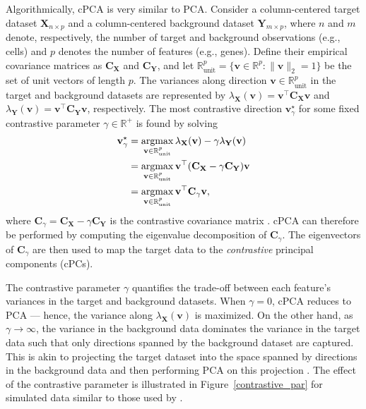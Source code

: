 Algorithmically, cPCA is very similar to PCA. Consider a column-centered target dataset $\mathbf{X}_{n \times p}$ and a column-centered background dataset $\mathbf{Y}_{m \times p}$, where $n$ and $m$ denote, respectively, the number of target and background observations (e.g., cells) and $p$ denotes the number of features (e.g., genes). Define their empirical covariance matrices as $\mathbf{C_X}$ and $\mathbf{C_Y}$, and let $\mathbb{R}_{\text{unit}}^p=\{\mathbf{v} \in \mathbb{R}^p: \lVert\mathbf{v}\rVert_2 = 1\}$ be the set of unit vectors of length $p$. The variances along direction $\mathbf{v} \in \mathbb{R}_{\text{unit}}^p$ in the target and background datasets are represented by $\lambda_{\mathbf{X}}(\mathbf{v}) = \mathbf{v}^\top\mathbf{C_X}\mathbf{v}$ and $\lambda_{\mathbf{Y}}(\mathbf{v}) = \mathbf{v}^\top\mathbf{C_Y}\mathbf{v}$, respectively. The most contrastive direction $\mathbf{v}^{\star}_\gamma$ for some fixed contrastive parameter $\gamma \in \mathbb{R}^+$ is found by solving
\begin{equation}
    \begin{aligned}
  \mathbf{v}^{\star}_\gamma & = \operatorname*{argmax}_{\mathbf{v} \in \mathbb{R}_{\text{unit}}^p}
  \lambda_{\mathbf{X}}(\mathbf{v})-
    \gamma \lambda_{\mathbf{Y}}(\mathbf{v}) \\
  & = \operatorname*{argmax}_{\mathbf{v} \in \mathbb{R}_{\text{unit}}^p}
    \mathbf{v}^\top(\mathbf{C_X} - \gamma\mathbf{C_Y})\mathbf{v} \\
  & = \operatorname*{argmax}_{\mathbf{v} \in \mathbb{R}_{\text{unit}}^p}
    \mathbf{v}^\top\mathbf{C}_{\gamma}\mathbf{v},
\end{aligned}
\end{equation}
where $\mathbf{C}_{\gamma} =  \mathbf{C_X} - \gamma\mathbf{C_Y}$ is the contrastive covariance matrix \cite{Abid2018}. cPCA can therefore be performed by computing the eigenvalue decomposition of $\mathbf{C}_{\gamma}$. The eigenvectors of $\mathbf{C}_{\gamma}$ are then used to map the target data to the \textit{contrastive} principal components (cPCs).

The contrastive parameter $\gamma$ quantifies the trade-off between each feature's variances in the target and background datasets. When $\gamma = 0$, cPCA reduces to PCA --- hence, the variance along $\lambda_{\mathbf{X}}(\mathbf{v})$ is maximized. On the other hand, as $\gamma \rightarrow \infty$, the variance in the background data dominates the variance in the target data such that only directions spanned by the background dataset are captured. This is akin to projecting the target dataset into the space spanned by directions in the background data and then performing PCA on this projection \cite{Abid2018}. The effect of the contrastive parameter is illustrated in Figure~\ref{contrastive_par} for simulated data similar to those used by \citet{Abid2018}.

